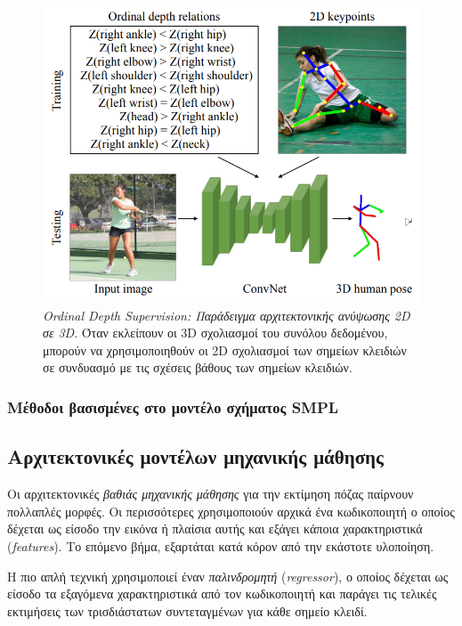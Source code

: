  \begin{figure}[h!]
    \centering
    \includegraphics[scale=0.5]{images/chapter2/3d_pose_estimation/ordinal_depth_architecture.png}
    \caption[Ordinal Depth Supervision: Παράδειγμα αρχιτεκτονικής ανύψωσης 2D σε 3D]{\textsl{Ordinal Depth Supervision: Παράδειγμα αρχιτεκτονικής ανύψωσης 2D σε 3D}. Όταν εκλείπουν οι 3D σχολιασμοί του συνόλου δεδομένου, μπορούν να χρησιμοποιηθούν οι 2D σχολιασμοί των σημείων κλειδιών σε συνδυασμό με τις σχέσεις βάθους των σημείων κλειδιών.}
    \label{fig:ordinal_depth_architecture}
\end{figure}

\subsubsection{Μέθοδοι βασισμένες στο μοντέλο σχήματος SMPL}

\subsection{Αρχιτεκτονικές μοντέλων μηχανικής μάθησης}

Οι αρχιτεκτονικές \textsl{βαθιάς μηχανικής μάθησης} για την εκτίμηση πόζας παίρνουν πολλαπλές μορφές. Οι περισσότερες χρησιμοποιούν αρχικά ένα κωδικοποιητή ο οποίος δέχεται ως είσοδο την εικόνα ή πλαίσια αυτής και εξάγει κάποια χαρακτηριστικά (\textsl{features}). Το επόμενο βήμα, εξαρτάται κατά κόρον από την εκάστοτε υλοποίηση.

Η πιο απλή τεχνική χρησιμοποιεί έναν \textsl{παλινδρομητή} (\textsl{regressor}), ο οποίος δέχεται ως είσοδο τα εξαγόμενα χαρακτηριστικά από τον κωδικοποιητή και παράγει τις τελικές εκτιμήσεις των τρισδιάστατων συντεταγμένων για κάθε σημείο κλειδί. 

